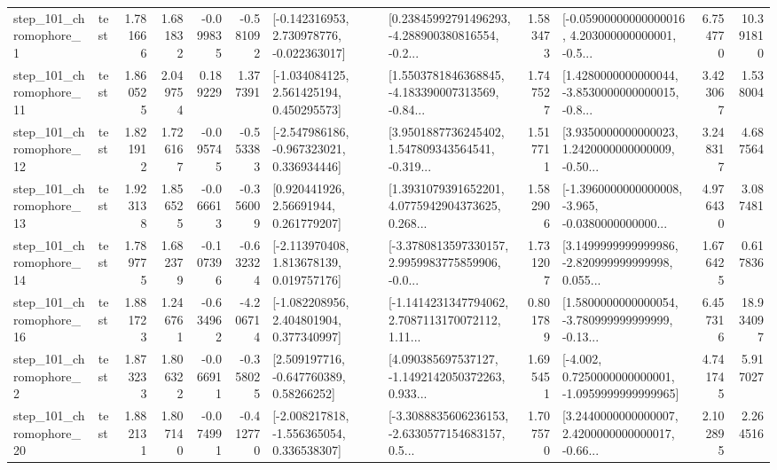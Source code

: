 \begin{tabular}{llrrrrllrlrr}
   step\_101\_chromophore\_1 &      test &      1.781666 &    1.681832 &     -0.099835 & -0.581092 &   [-0.142316953, 2.730978776, -0.022363017] &  [0.23845992791496293, -4.288900380816554, -0.2... &       1.583473 &  [-0.05900000000000016, 4.203000000000001, -0.5... &            6.754770 &         10.391810 \\
  step\_101\_chromophore\_11 &      test &      1.860525 &    2.049754 &      0.189229 &  1.377391 &    [-1.034084125, 2.561425194, 0.450295573] &  [1.5503781846368845, -4.183390007313569, -0.84... &       1.747527 &  [1.4280000000000044, -3.8530000000000015, -0.8... &            3.423067 &          1.538004 \\
  step\_101\_chromophore\_12 &      test &      1.821912 &    1.726167 &     -0.095745 & -0.553383 &   [-2.547986186, -0.967323021, 0.336934446] &  [3.9501887736245402, 1.547809343564541, -0.319... &       1.517711 &  [3.9350000000000023, 1.2420000000000009, -0.50... &            3.248317 &          4.687564 \\
  step\_101\_chromophore\_13 &      test &      1.923138 &    1.856525 &     -0.066613 & -0.356009 &      [0.920441926, 2.56691944, 0.261779207] &  [1.3931079391652201, 4.0775942904373625, 0.268... &       1.582906 &  [-1.3960000000000008, -3.965, -0.0380000000000... &            4.976430 &          3.087481 \\
  step\_101\_chromophore\_14 &      test &      1.789775 &    1.682379 &     -0.107396 & -0.632324 &    [-2.113970408, 1.813678139, 0.019757176] &  [-3.3780813597330157, 2.9959983775859906, -0.0... &       1.731207 &  [3.1499999999999986, -2.820999999999998, 0.055... &            1.676425 &          0.617836 \\
  step\_101\_chromophore\_16 &      test &      1.881723 &    1.246761 &     -0.634962 & -4.206714 &    [-1.082208956, 2.404801904, 0.377340997] &  [-1.1414231347794062, 2.7087113170072112, 1.11... &       0.801789 &  [1.5800000000000054, -3.780999999999999, -0.13... &            6.457316 &         18.934097 \\
   step\_101\_chromophore\_2 &      test &      1.873233 &    1.806322 &     -0.066911 & -0.358025 &     [2.509197716, -0.647760389, 0.58266252] &  [4.090385697537127, -1.1492142050372263, 0.933... &       1.695451 &  [-4.002, 0.7250000000000001, -1.0959999999999965] &            4.741745 &          5.917027 \\
  step\_101\_chromophore\_20 &      test &      1.882131 &    1.807140 &     -0.074991 & -0.412770 &   [-2.008217818, -1.556365054, 0.336538307] &  [-3.3088835606236153, -2.6330577154683157, 0.5... &       1.707570 &  [3.2440000000000007, 2.4200000000000017, -0.66... &            2.102895 &          2.264516 \\

\end{tabular}
